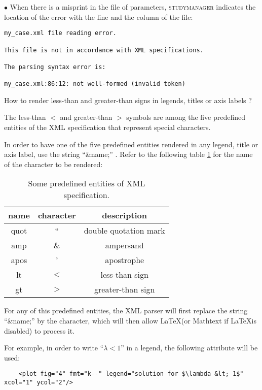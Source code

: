 \documentclass[a4paper,10pt,twoside]{csshortdoc}
\begin{document}
\begin{list}{$\bullet$}{}
When there is a misprint in the file of parameters,
\textsc{studymanager} indicates the location of the error
with the line and the column of the file:
\small
\begin{verbatim}
my_case.xml file reading error.

This file is not in accordance with XML specifications.

The parsing syntax error is:

my_case.xml:86:12: not well-formed (invalid token)
\end{verbatim}
\normalsize

\item How to render less-than and greater-than signs in legends, titles or axis labels ?

The less-than $<$ and greater-than $>$ symbols are among the five predefined
entities of the XML specification that represent special characters.

In order to have one of the five predefined entities rendered in any legend, title or axis
label, use the string ``\&name;'' . Refer to the following table \ref{table:XMLPredefEnt}
for the name of the character to be rendered:

\begin{table}[htbp]
\begin{center}
\begin{tabular}{|c|c|c|}
\hline
\textbf{name} & \textbf{character} & \textbf{description} \\
\hline
quot & ``  & double quotation mark \\
amp  & \&  & ampersand             \\
apos & '   & apostrophe            \\
lt   & $<$ & less-than sign        \\
gt   & $>$ & greater-than sign     \\
\hline
\end{tabular}
\end{center}
\caption{Some predefined entities of XML specification.}
\label{table:XMLPredefEnt}
\end{table}

For any of this predefined entities, the XML parser will first replace the string ``\&name;''
by the character, which will then allow \LaTeX (or Mathtext if \LaTeX is disabled) to process it.

For example, in order to write ``$\lambda<1$'' in a legend, the following attribute will be used:
\small
\begin{verbatim}
    <plot fig="4" fmt="k--" legend="solution for $\lambda &lt; 1$" xcol="1" ycol="2"/>
\end{verbatim}
\normalsize


\end{list}
\end{document}
